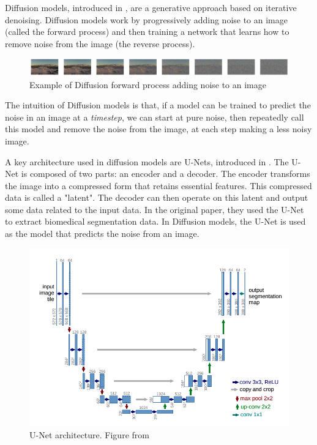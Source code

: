 Diffusion models, introduced in \cite{ho_denoising_2020}, are a generative approach based on iterative denoising. Diffusion models work by progressively adding noise to an image (called the forward process) and then training a network that learns how to remove noise from the image (the reverse process).

\begin{figure}[htbp]
\centering
\includegraphics[width=1.2\textwidth]{figures/noise_to_image.png}
\caption{Example of Diffusion forward process adding noise to an image}
\label{fig:noise_to_image}
\end{figure}

The intuition of Diffusion models is that, if a model can be trained to predict
the noise in an image at a \emph{timestep}, we can start at pure noise, then repeatedly call this model and remove the noise from the image, at each step making a less noisy image.

A key architecture used in diffusion models are U-Nets, introduced in \cite{ronneberger_u-net_2015}. The U-Net is composed of two parts: an encoder and a decoder. The encoder transforms the image into a compressed form that retains essential features. This compressed data is called a "latent". The decoder can then operate on this latent and output some data related to the input data. In the original paper, they used the U-Net to extract biomedical segmentation data. In Diffusion models, the U-Net is used as the model that predicts the noise from an image.

\begin{figure}[htbp]
\centering
\includegraphics[width=1.0\textwidth]{figures/unet_architecture.png}
\caption{U-Net architecture. Figure from \cite{ronneberger_u-net_2015}}
\label{fig:unet_architecture}
\end{figure}

